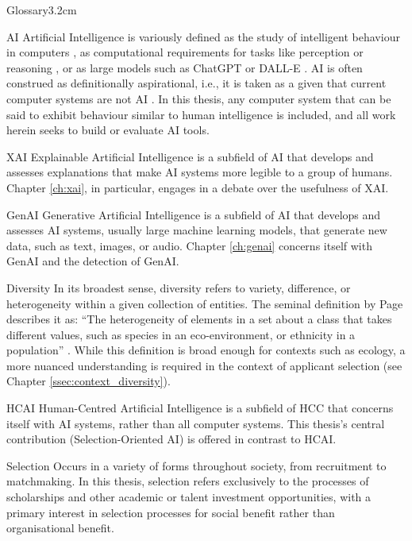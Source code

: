 \begin{mclistof}{Glossary}{3.2cm}
    \item[AI] Artificial Intelligence is variously defined as the study of intelligent behaviour in computers \cite{wang2008you}, as computational requirements for tasks like perception or reasoning \cite{Leake2001ArtiicialI}, or as large models such as ChatGPT or DALL-E \cite{du2020ai}. AI is often construed as definitionally aspirational, i.e., it is taken as a given that current computer systems are not AI \cite{wang2008you}. In this thesis, any computer system that can be said to exhibit behaviour similar to human intelligence is included, and all work herein seeks to build or evaluate AI tools.

    \item[XAI] Explainable Artificial Intelligence is a subfield of AI that develops and assesses explanations that make AI systems more legible to a group of humans. Chapter \ref{ch:xai}, in particular, engages in a debate over the usefulness of XAI.

    \item[GenAI] Generative Artificial Intelligence is a subfield of AI that develops and assesses AI systems, usually large machine learning models, that generate new data, such as text, images, or audio. Chapter \ref{ch:genai} concerns itself with GenAI and the detection of GenAI.

    \item[Diversity] In its broadest sense, diversity refers to variety, difference, or heterogeneity within a given collection of entities. The seminal definition by Page describes it as: ``The heterogeneity of elements in a set about a class that takes different values, such as species in an eco-environment, or ethnicity in a population'' \cite{page_diversity_2010}. While this definition is broad enough for contexts such as ecology, a more nuanced understanding is required in the context of applicant selection (see Chapter \ref{ssec:context_diversity}).

    \item[HCAI] Human-Centred Artificial Intelligence is a subfield of HCC that concerns itself with AI systems, rather than all computer systems. This thesis's central contribution (Selection-Oriented AI) is offered in contrast to HCAI.

    \item[Selection] Occurs in a variety of forms throughout society, from recruitment to matchmaking. In this thesis, selection refers exclusively to the processes of scholarships and other academic or talent investment opportunities, with a primary interest in selection processes for social benefit rather than organisational benefit.


\end{mclistof}

